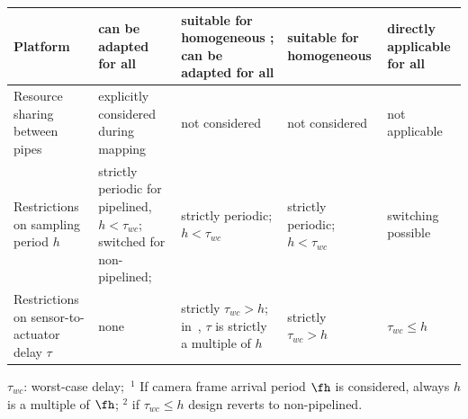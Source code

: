 \begin{table}[t]
{\begin{threeparttable}
\begin{tabular}{|p{2.9cm}|p{3.9cm}|p{2.9cm}|p{2.5cm}|p{2.9cm}|}
Platform                  & can be adapted for all  & suitable for homogeneous \cite{krautgartner1998performance}\cite{medina2019designing}; can be adapted for all \cite{medina2019implementation} & suitable for homogeneous & directly applicable for all   \\ \hline
Resource sharing between pipes & explicitly considered during mapping & not considered & not considered & not applicable \\ \hline
Restrictions on sampling period $h$\tnote{1}      & strictly periodic for pipelined, $h < \tau_{wc}$; switched for non-pipelined;  &  strictly periodic; $h < \tau_{wc}$    &  strictly periodic; $h < \tau_{wc}$  & switching possible
\\ \hline
Restrictions on sensor-to-actuator delay $\tau$  & none   & strictly $\tau_{wc} > h$; in~\cite{medina2019designing}, $\tau$ is strictly a multiple of $h$ & strictly\tnote{2}~~ $\tau_{wc}>h$  & $\tau_{wc} \le h$   \\ \hline
\end{tabular}%
\begin{tablenotes}
			\footnotesize
			\item{$\tau_{wc}$: worst-case delay;\ $^1$ If camera frame arrival period $\fh$ is considered, always $h$ is a multiple of $\fh$; $^2$ if $\tau_{wc}\le h$ design reverts to non-pipelined.} 
		\end{tablenotes}
		\end{threeparttable}
}
\end{table}

